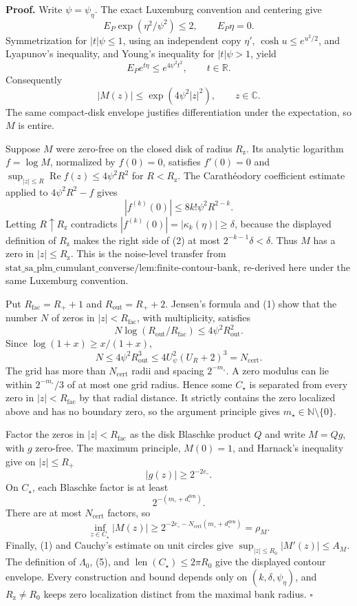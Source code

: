 \textbf{Proof.}
Write \(\psi=\psi_\eta\). The exact Luxemburg convention and centering give
\[
 E_P\exp(\eta^2/\psi^2)\le2,
 \qquad E_P\eta=0.
\]
Symmetrization for \(|t|\psi\le1\), using an independent copy \(\eta'\), \(\cosh u\le e^{u^2/2}\), and Lyapunov's inequality, and Young's inequality for \(|t|\psi>1\), yield
\[
 E_Pe^{t\eta}\le e^{4\psi^2t^2},\qquad t\in\mathbb R.
\]
Consequently
\[
 |M(z)|\le\exp(4\psi^2|z|^2),\qquad z\in\mathbb C. \tag{1}
\]
The same compact-disk envelope justifies differentiation under the expectation, so \(M\) is entire.

Suppose \(M\) were zero-free on the closed disk of radius \(R_{\mathrm z}\). Its analytic logarithm \(f=\log M\), normalized by \(f(0)=0\), satisfies \(f'(0)=0\) and \(\sup_{|z|\le R}\operatorname{Re}f(z)\le4\psi^2R^2\) for \(R<R_{\mathrm z}\). The Carath\'eodory coefficient estimate applied to \(4\psi^2R^2-f\) gives
\[
 |f^{(k)}(0)|\le8k!\psi^2R^{2-k}. \tag{2}
\]
Letting \(R\uparrow R_{\mathrm z}\) contradicts \(|f^{(k)}(0)|=|\kappa_k(\eta)|\ge\delta\), because the displayed definition of \(R_{\mathrm z}\) makes the right side of (2) at most \(2^{-k-1}\delta<\delta\). Thus \(M\) has a zero in \(|z|\le R_{\mathrm z}\). This is the noise-level transfer from \(\text{stat\_sa\_plm\_cumulant\_converse/lem:finite-contour-bank}\), re-derived here under the same Luxemburg convention.

Put \(R_{\mathrm{fac}}=R_++1\) and \(R_{\mathrm{out}}=R_++2\). Jensen's formula and (1) show that the number \(N\) of zeros in \(|z|<R_{\mathrm{fac}}\), with multiplicity, satisfies
\[
 N\log(R_{\mathrm{out}}/R_{\mathrm{fac}})
 \le4\psi^2R_{\mathrm{out}}^2.
\]
Since \(\log(1+x)\ge x/(1+x)\),
\[
 N\le4\psi^2R_{\mathrm{out}}^3
 \le4U_\psi^2(U_R+2)^3=N_{\mathrm{cert}}. \tag{3}
\]
The grid has more than \(N_{\mathrm{cert}}\) radii and spacing \(2^{-m_\circ}\). A zero modulus can lie within \(2^{-m_\circ}/3\) of at most one grid radius. Hence some \(C_\star\) is separated from every zero in \(|z|<R_{\mathrm{fac}}\) by that radial distance. It strictly contains the zero localized above and has no boundary zero, so the argument principle gives \(m_\star\in\mathbb N\setminus\{0\}\).

Factor the zeros in \(|z|<R_{\mathrm{fac}}\) as the disk Blaschke product \(Q\) and write \(M=Qg\), with \(g\) zero-free. The maximum principle, \(M(0)=1\), and Harnack's inequality give on \(|z|\le R_+\)
\[
 |g(z)|\ge2^{-2e_\circ}. \tag{4}
\]
On \(C_\star\), each Blaschke factor is at least
\[
 2^{-(m_\circ+d_\circ^{\mathrm{den}})}.
\]
There are at most \(N_{\mathrm{cert}}\) factors, so
\[
 \inf_{z\in C_\star}|M(z)|
 \ge2^{-2e_\circ-N_{\mathrm{cert}}(m_\circ+d_\circ^{\mathrm{den}})}
 =\rho_M. \tag{5}
\]
Finally, (1) and Cauchy's estimate on unit circles give \(\sup_{|z|\le R_0}|M'(z)|\le A_M\). The definition of \(\Lambda_0\), (5), and \(\operatorname{len}(C_\star)\le2\pi R_0\) give the displayed contour envelope. Every construction and bound depends only on \((k,\delta,\psi_\eta)\), and \(R_{\mathrm z}\ne R_0\) keeps zero localization distinct from the maximal bank radius. \(\square\)